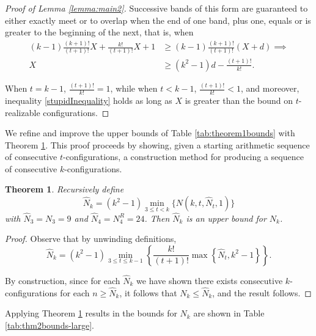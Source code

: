 \documentclass[reqno,12pt]{amsart}
\theoremstyle{plain}
\newtheorem{theorem}{Theorem}%
\theoremstyle{definition}
\theoremstyle{remark}
\begin{document}
\begin{proof}[Proof of Lemma \ref{lemma:main2}]
Successive bands of this form are guaranteed to either exactly meet or to overlap when the end of one band, plus one, 
equals or is greater to the beginning of the next, that is, when
%
\begin{align}
(k-1)\frac{(k+1)!}{(t+1)!}X+\frac{k!}{(t+1)!}X +1 &\geq (k-1)\frac{(k+1)!}{(t+1)!}(X+d) \implies \nonumber \\ 
%
X &\geq (k^{2}-1)d - \frac{(t+1)!}{k!}. \label{stupidInequality}
\end{align}

When $t = k-1$, $\frac{(t+1)!}{k!}  = 1$, while when $t <k-1$, $\frac{(t+1)!}{k!}  < 1$, and moreover, inequality \eqref{stupidInequality} 
holds as long as $X$ is greater than the bound on $t$-realizable configurations.
\end{proof}


We refine and improve the upper bounds of Table \ref{tab:theorem1bounds} with Theorem \ref{thm:main2}. 
This proof proceeds by showing, given a starting arithmetic sequence of consecutive $t$-configurations, 
a construction method for producing a sequence of consecutive $k$-configurations.


\begin{theorem}\label{thm:main2} Recursively define \[\hat{N}_{k} = (k^{2}-1)\min_{3 \leq t < k}\{ N(k, t, \hat{N}_{t}, 1)\}\]
with $\hat{N}_{3} = N_{3} = 9$ and $\hat{N}_{4}= N^{R}_{4}= 24$.
Then $\hat{N}_{k}$ is an upper bound for $N_k$. 
\end{theorem}

\begin{proof}
Observe that by unwinding definitions, \[\hat{N}_{k} = (k^{2}-1) \min_{3 \leq t \leq k-1} \left\{ \frac{k!}{(t+1)!}\max\left\{\hat{N}_{t}, k^{2}-1\right\}\right\}.\]

By construction, since for each $\hat{N}_{k}$ we have shown there exists consecutive $k$-configurations for each $n \geq \hat{N}_{k}$, it follows that
$N_{k} \leq \hat{N}_{k}$, and the result follows.
\end{proof}

Applying Theorem \ref{thm:main2} results in the bounds for $N_{k}$ are shown in Table \ref{tab:thm2bounds-large}.
\end{document}
